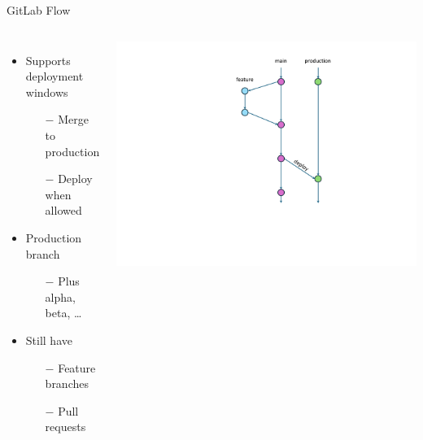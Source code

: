 \documentclass{slide}
\begin{document}
\begin{frame}{GitLab Flow \cite{gitlab-flow}}
    \vspace{1pt}
    \begin{columns}
      {\LARGE
        \begin{itemize}
            \item Supports deployment windows
            \begin{itemize}
                \Large\item[$-$] Merge to production
                \vspace{0.5mm}
                \Large\item[$-$] Deploy when allowed
            \end{itemize}
            \vspace{2mm}
            \item Production branch
            \begin{itemize}
                \Large\item[$-$] Plus alpha, beta, \dots
            \end{itemize}
            \vspace{1.5mm}
            \item Still have
            \begin{itemize}
                \Large\item[$-$] Feature branches
                \vspace{0.5mm}
                \Large\item[$-$] Pull requests
            \end{itemize}
        \end{itemize}
      }
        \centering
        \includegraphics[trim=275 100 125 33,clip,height=\textheight]{diagrams/branching-diagrams/gitlab-flow}
    \end{columns}
\end{frame}
\end{document}
